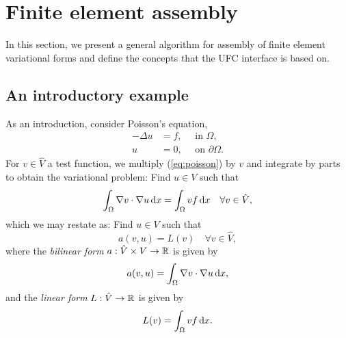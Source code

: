 \chapter{Finite element assembly}
\label{sec:assembly}

\newtheorem{example}{\small{}}[section]

In this section, we present a general algorithm for assembly of finite
element variational forms and define the concepts that the UFC
interface is based on.

\section{An introductory example}

As an introduction, consider Poisson's equation,
\begin{equation}
  \label{eq:poisson}
  \begin{split}
  - \Delta u &= f, \quad \mbox{ in } \Omega, \\
  u &= 0, \quad \mbox{ on } \partial\Omega.
  \end{split}
\end{equation}
For $v \in \hat{V}$ a test function, we multiply (\ref{eq:poisson}) by
$v$ and integrate by parts to obtain the variational problem: Find $u
\in V$ such that
\begin{equation} \label{eq:poissonvariational}
  \int_{\Omega} \nabla v \cdot \nabla u \, \mathrm{d}x = \int_{\Omega} v f \, \mathrm{d}x
  \quad \forall v \in \hat{V},
\end{equation}
which we may restate as: Find $u \in V$ such that
\begin{equation}
  a(v, u) = L(v) \quad \forall v \in \hat{V},
\end{equation}
where the \emph{bilinear form} $a : \hat{V} \times V \rightarrow \mathbb{R}$
is given by
\begin{equation}
  a(v, u) = \int_{\Omega} \nabla v \cdot \nabla u \, \mathrm{d}x,
\end{equation}
and the \emph{linear form} $L : \hat{V} \rightarrow \mathbb{R}$ is given by
\begin{equation}
  L(v) = \int_{\Omega} v f \, \mathrm{d}x.
\end{equation}

